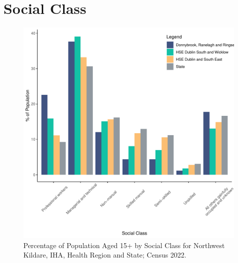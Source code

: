 \documentclass{article}
\begin{document}
\section{Social Class}\label{sect:SC}
\begin{figure}[H]
	\centering
	\includegraphics[width = 140mm]{../figures/SocialClassED.pdf}
	\caption{Percentage of Population Aged 15+ by Social Class for Northwest Kildare, IHA, Health Region and State; Census 2022.}
	\label{fig:vbnv}
	\end{figure}
\end{document}
